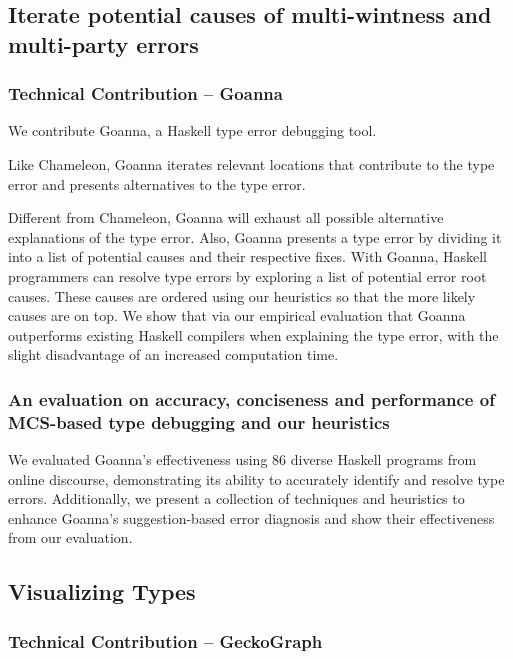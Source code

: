 \subsection{Iterate potential causes of multi-wintness and multi-party errors}

\subsubsection{Technical Contribution -- Goanna}

We contribute Goanna, a Haskell type error debugging tool. 

Like Chameleon, Goanna iterates relevant locations that contribute to the type error and presents alternatives to the type error. 

Different from Chameleon, Goanna will exhaust all possible alternative explanations of the type error. Also, Goanna presents a type error by dividing it into a list of potential causes and their respective fixes. With Goanna, Haskell programmers can resolve type errors by exploring a list of potential error root causes. These causes are ordered using our heuristics so that the more likely causes are on top. We show that via our empirical evaluation that Goanna outperforms existing Haskell compilers when explaining the type error, with the slight disadvantage of an increased computation time.

\subsubsection{An evaluation on accuracy, conciseness and performance of MCS-based type debugging and our heuristics}

We evaluated Goanna's effectiveness using 86 diverse Haskell programs from online discourse, demonstrating its ability to accurately identify and resolve type errors. Additionally, we present a collection of techniques and heuristics to enhance Goanna's suggestion-based error diagnosis and show their effectiveness from our evaluation.


\subsection{Visualizing Types}

\subsubsection{Technical Contribution -- GeckoGraph}

